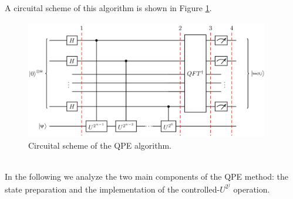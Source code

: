A circuital scheme of this algorithm is shown in Figure \ref{QPE}.
\begin{figure}[ht]
  \centering
  \includegraphics[width=0.95\textwidth]{figures/Phase estimation circuit.png}
  \caption{Circuital scheme of the QPE algorithm.} \label{QPE}
\end{figure} \\
In the following we analyze the two main components of the QPE method: the state preparation and the implementation of the controlled-$U^{2^j}$ operation.

